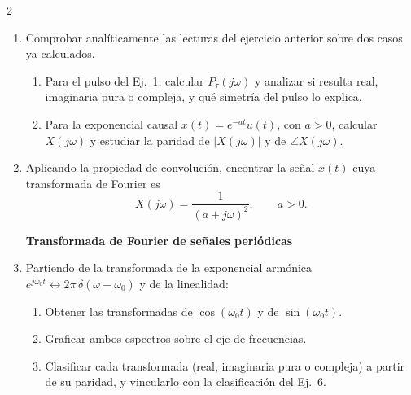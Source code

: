 \documentclass[10pt,a4paper]{article}
\begin{document}
\begin{multicols}{2}
\begin{enumerate}
			\item Comprobar analíticamente las lecturas del ejercicio anterior sobre dos casos ya calculados.
			\begin{enumerate}
				\item Para el pulso del Ej.~1, calcular $P_\tau(j\omega)$ y analizar si resulta real, imaginaria pura o compleja, y qué simetría del pulso lo explica.
				\item Para la exponencial causal $x(t) = e^{-at}u(t)$, con $a>0$, calcular $X(j\omega)$ y estudiar la paridad de $|X(j\omega)|$ y de $\angle X(j\omega)$.
			\end{enumerate}

			\item Aplicando la propiedad de convolución, encontrar la señal $x(t)$ cuya transformada de Fourier es
			\[
				X(j\omega) = \frac{1}{(a+j\omega)^2}, \qquad a>0.
			\]

			\textbf{Transformada de Fourier de señales periódicas}
			\item Partiendo de la transformada de la exponencial armónica $e^{j\omega_0 t} \leftrightarrow 2\pi\,\delta(\omega - \omega_0)$ y de la linealidad:
			\begin{enumerate}
				\item Obtener las transformadas de $\cos(\omega_0 t)$ y de $\sin(\omega_0 t)$.
				\item Graficar ambos espectros sobre el eje de frecuencias.
				\item Clasificar cada transformada (real, imaginaria pura o compleja) a partir de su paridad, y vincularlo con la clasificación del Ej.~6.
			\end{enumerate}


\end{enumerate}
\end{multicols}
\end{document}
